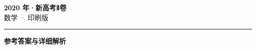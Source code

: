 \documentclass[zihao=5, a4paper]{ctexart}
\begin{document}
\begin{center}
  {\Large\bfseries 2020 年·新高考Ⅱ卷}\\[4pt]
  {\large 数学 · 印刷版}
\end{center}
\medskip
{}

\par\bigskip\hrule\bigskip
{}
\begin{center}{\large\bfseries 参考答案与详细解析}\end{center}
\smallskip

\end{document}

